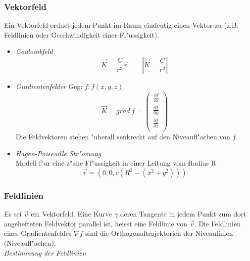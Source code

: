 \documentclass[10pt, a4paper, twocolumn]{scrartcl}
\begin{document}
\subsubsection{Vektorfeld}
Ein Vektorfeld ordnet jedem Punkt im Raum eindeutig einen Vektor zu (z.B. Feldlinien oder Geschwindigkeit einer Fl"ussigkeit).\\

\begin{itemize}
 \item \textit{Coulombfeld}
  $$\vec{K}=\frac{C}{r^3}\vec{r}\qquad|\vec{K}=\frac{C}{r^2}|$$
 \item \textit{Gradientenfelder} Geg: $f:f(x,y,z)$
  $$\vec{K}=grad\:f=
  \left (
  \begin{array}{c}
   \frac{\partial f}{\partial x}\\
   \frac{\partial f}{\partial y}\\
   \frac{\partial f}{\partial z}\\
  \end{array}
  \right )
  $$
  Die Feldvektoren stehen "uberall senkrecht auf den Niveaufl"achen von $f$.
 \item \textit{Hagen-Poiseuille Str"omung}\\
  Modell f"ur eine z"ahe Fl"ussigkeit in einer Leitung vom Radius R
  $$\vec{v}=(0,0,c(R^2-(x^2+y^2)))$$
\end{itemize}

\subsubsection{Feldlinien}

Es sei $\vec{v}$ ein Vektorfeld. Eine Kurve $\gamma$ deren Tangente in jedem Punkt zum dort angehefteten Feldvektor parallel ist, heisst eine Feldlinie von $\vec{v}$. Die Feldlinien eines Gradientenfeldes $\nabla f$ sind die Orthogonaltrajektorien der Niveaulinien (Niveaufl"achen).\\

\textit{Bestimmung der Feldlinien}
\end{document}
